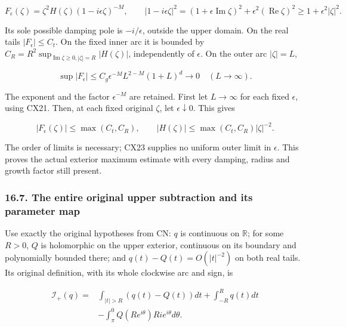 \documentclass[
  11pt,
]{article}
\makeatletter
\let\ReaderOriginalAnchorStart\hyper@anchorstart
\let\ReaderOriginalAnchorEnd\hyper@anchorend
\let\ReaderPendingAliases\@empty
\def\ReaderArmAliases#1{\gdef\ReaderPendingAliases{#1}}
\def\hyper@anchorstart#1{\ReaderIfNativeAnchorTF{#1}{\ReaderPendingAliases\global\let\ReaderPendingAliases\@empty}{}\ReaderOriginalAnchorStart{#1}}
\makeatother
\begin{document}
\[
F_\epsilon(\zeta)=\zeta^2H(\zeta)(1-i\epsilon\zeta)^{-M},
\qquad
|1-i\epsilon\zeta|^2
 =(1+\epsilon\operatorname{Im}\zeta)^2
                     +\epsilon^2(\operatorname{Re}\zeta)^2
 \geq1+\epsilon^2|\zeta|^2 .
\tag{CX22}
\]

Its sole possible damping pole is \(-i/\epsilon\), outside the upper
domain. On the real tails \(|F_\epsilon|\leq C_t\). On the fixed inner
arc it is bounded by
\(C_R=R^2\sup_{\operatorname{Im}\zeta\geq0,|\zeta|=R}|H(\zeta)|\),
independently of \(\epsilon\). On the outer arc \(|\zeta|=L\),

\[
\sup|F_\epsilon|
\leq C_g\epsilon^{-M}L^{2-M}(1+L)^d
\longrightarrow0\quad(L\longrightarrow\infty).
\tag{CX23}
\]

The exponent and the factor \(\epsilon^{-M}\) are retained. First let
\(L\to\infty\) for each fixed \(\epsilon\), using CX21. Then, at each
fixed original \(\zeta\), let \(\epsilon\downarrow0\). This gives

\[
|F_\epsilon(\zeta)|\leq\max(C_t,C_R),\qquad
|H(\zeta)|\leq\max(C_t,C_R)|\zeta|^{-2}.
\tag{CX24}
\]

The order of limits is necessary; CX23 supplies no uniform outer limit
in \(\epsilon\). This proves the actual exterior maximum estimate with
every damping, radius and growth factor still present.

\ReaderArmAliases{\ReaderOriginalAnchorStart{AN03-CN-COMPLEX-007}\ReaderOriginalAnchorEnd\begingroup\expandafter\def\csname @currentHref\endcsname{AN03-CN-COMPLEX-007}\label{AN03-CN-COMPLEX-007}\endgroup\ReaderOriginalAnchorStart{the-entire-original-upper-subtraction-and-its-parameter-map}\ReaderOriginalAnchorEnd}
\subsubsection{16.7. The entire original upper subtraction and its
parameter
map}\label{the-entire-original-upper-subtraction-and-its-parameter-map}

Use exactly the original hypotheses from CN: \(q\) is continuous on
\(\mathbb R\); for some \(R>0\), \(Q\) is holomorphic on the upper
exterior, continuous on its boundary and polynomially bounded there; and
\(q(t)-Q(t)=O(|t|^{-2})\) on both real tails. Its original definition,
with its whole clockwise arc and sign, is

\[
\begin{split}
\mathcal I_+(q)={}&
\int_{|t|>R}(q(t)-Q(t))dt+\int_{-R}^{R}q(t)dt\\
&-\int_{\pi}^{0}Q(Re^{i\theta})Ri e^{i\theta}d\theta.
\end{split}
\tag{CX25}
\]
\end{document}
